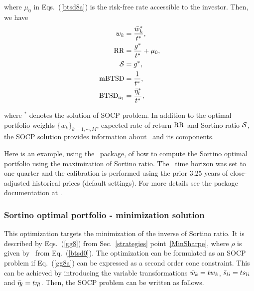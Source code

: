 \noindent where $\mu_0$ in Eqs.~(\ref{btsd8a}) is the
risk-free rate accessible to the investor.
Then, we have
\begin{subequations}\label{btsd9}
\begin{align}
    w_k &= \frac{\bw_k^*}{t^*} , \label{btsd9a} \\
    \RR &= \frac{g^*}{t^*} + \mu_0, \label{btsd9c} \\
    \Sortino &= g^*, \label{btsd9b} \\
    \mBTSD &= \frac{1}{t^*}, \label{btsd9d} \\
    \BTSD_{\alpha_l} &= \frac{\bbeta_l^*}{t^*}, \label{btsd9e}
\end{align}
\end{subequations}

\noindent where $^*$ denotes the solution of SOCP problem.
In addition to the optimal portfolio weights $\{w_k\}_{k=1,\cdots,M}$, expected rate of return ${\rm RR}$ and
Sortino ratio ${\cal S}$,
the SOCP solution provides information about \mBTSD\ and its components.

\bigskip
\noindent Here is an example, using the \azapy\ package, of how to compute the Sortino optimal portfolio using the maximization
of Sortino ratio.
The \mBTSD\ time horizon was set to one quarter and the calibration is performed using the prior 3.25 years of
close-adjusted historical prices (default settings).
For more details see the package documentation at \azapydoc.



\BackToContents


\subsubsection{Sortino optimal portfolio - minimization solution}
This optimization targets the minimization of the inverse of Sortino ratio.
It is described by Eqs.~(\ref{gg8}) from Sec.~\ref{strategies} point~\ref{MinSharpe}, where
$\rho$ is given by \mBTSD\ from Eq.~(\ref{btsd0}).
The optimization can be formulated as an SOCP problem if Eq.~(\ref{gg8a}) can  be expressed as a second order cone constraint. This can be achieved by
introducing the variable transformations
${\bar w}_k = t w_k$, ${\bar s}_{li} = t s_{li}$ and ${\bar \eta}_l = t \eta_l$.
Then, the SOCP problem can be written as follows.

